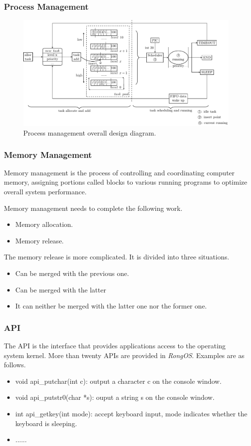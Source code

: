 \documentclass{beamer}
\begin{document}
\begin{frame}
\frametitle{Process Management}
\begin{figure}
\includegraphics[scale=0.5]{../thesis/figs/process-manage.pdf}
\caption{Process management overall design diagram.}
\end{figure}
\end{frame}



\begin{frame}
\frametitle{Memory Management}
Memory management is the process of controlling and coordinating computer memory,
assigning portions called blocks to various running programs to optimize overall system
performance.

Memory management needs to complete the following work.

\begin{itemize}
\item Memory allocation.
\item Memory release.
\end{itemize}
The memory release is more complicated. It is divided into three situations.
\begin{itemize}
\item Can be merged with the previous one.
\item Can be merged with the latter
\item It can neither be merged with the latter one nor the former one.
\end{itemize}
\end{frame}

\begin{frame}
\frametitle{API}
The API is the interface that provides applications access to the operating system
kernel. More than twenty APIs are provided in \emph{RongOS}. Examples are as follows.

\begin{examples}
  \begin{itemize}
  \item void api\_putchar(int c): output a character c on the console window.
  \item void api\_putstr0(char *s): ouput a string s on the console window.
  \item int api\_getkey(int mode): accept keyboard input, mode indicates whether the
    keyboard is sleeping.
  \item ......
  \end{itemize}
\end{examples}

\end{frame}
\end{document}
